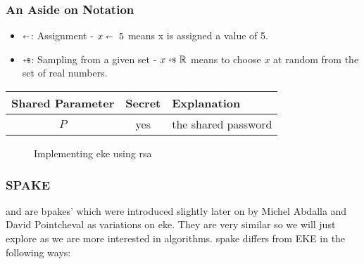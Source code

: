 \subsubsection{An Aside on Notation}
\begin{itemize}
  \item $\shortleftarrow$: Assignment - $x \shortleftarrow \ 5$ means x is assigned a value of 5.
  \item $\shortleftarrow\kern-1.5ex\text{\scriptsize \$}$: Sampling from a given set - $x \cryptoSample \ \mathbb{R}$ means to choose $x$ at random from the set of real numbers.
\end{itemize}

\begin{center}
  \begin{tabular}{ ccl }
    \toprule
    Shared Parameter & Secret & Explanation \\
    \midrule
    $P$ & yes & the shared password \\
    \bottomrule
  \end{tabular}
\end{center}

\begin{figure}[H]

  \caption{Implementing \gls{eke} using \gls{rsa}}
  \label{fig:eke-rsa}
\end{figure}

\clearpage

\subsubsection{SPAKE}
 and  are \glspl{bpake}' which were introduced slightly later on by Michel Abdalla and David Pointcheval \cite{spake} as variations on \gls{eke}.
They are very similar so we will just explore  as we are more interested in  algorithms.
\gls{spake} differs from EKE in the following ways:

